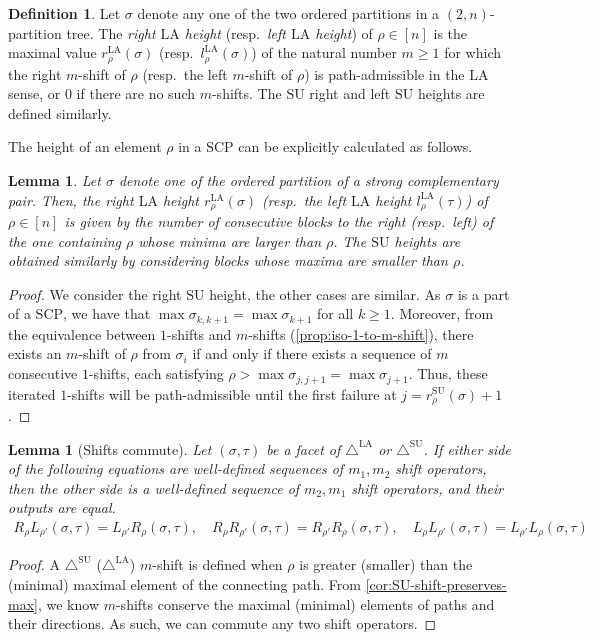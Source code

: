 \documentclass{amsart}
\newcommand{\darkblue}{\color{darkblue}} %
\newcommand{\Guillaume}[1]{\todo[color=magenta!30]{\rm #1 \\ \hfill --- G.}}
\newtheorem{lemma}[theorem]{Lemma}
\theoremstyle{definition}
\newtheorem{definition}[theorem]{Definition}
\newcommand{\resp}{resp.~} %
\newcommand{\defn}[1]{\textsl{\darkblue #1}} %
\newcommand{\SU}{\mathrm{SU}}
\newcommand{\LA}{\mathrm{LA}}
\newcommand{\SUD}{\triangle^{\mathrm{SU}}}
\newcommand{\LAD}{\triangle^{\mathrm{LA}}}
\newcommand{\SCP}{\mathrm{SCP}}
\begin{document}
\begin{definition}
Let $\sigma$ denote any one of the two ordered partitions in a $(2,n)$-partition tree.
The \defn{right $\LA$ height} (\resp \defn{left $\LA$ height}) of $\rho \in [n]$ is the maximal value $r_\rho^\LA(\sigma)$ (\resp $l_\rho^\LA(\sigma)$) of the natural number $m \geq 1$ for which the right $m$-shift of $\rho$ (\resp the left $m$-shift of $\rho$) is path-admissible in the $\LA$ sense, or $0$ if there are no such $m$-shifts.
The $\SU$ right and left $\SU$ heights are defined similarly. 
\end{definition}
\Guillaume{Maybe we can think of a simpler notation?}

The height of an element $\rho$ in a $\SCP$ can be explicitly calculated as follows. 

\begin{lemma}
\label{prop:maximal m-shift formulae}
Let $\sigma$ denote one of the ordered partition of a strong complementary pair. 
Then, the right $\LA$ height $r_\rho^\LA(\sigma)$ (\resp the left $\LA$ height $l_\rho^\LA(\tau)$) of $\rho \in [n]$ is given by the number of consecutive blocks to the right (\resp left) of the one containing $\rho$ whose minima are larger than $\rho$.
The $\SU$ heights are obtained similarly by considering blocks whose maxima are smaller than $\rho$. 
\end{lemma}

\begin{proof}
We consider the right $\SU$ height, the other cases are similar. 
As $\sigma$ is a part of a $\SCP$, we have that $\max \sigma_{k,k+1} = \max \sigma_{k+1}$ for all $k\geq 1$. 
Moreover, from the equivalence between $1$-shifts and $m$-shifts (\cref{prop:iso-1-to-m-shift}), there exists an $m$-shift of $\rho$ from $\sigma_i$ if and only if there exists a sequence of $m$ consecutive $1$-shifts, each satisfying $\rho > \max \sigma_{j,j+1}=\max \sigma_{j+1}$.
Thus, these iterated $1$-shifts will be path-admissible until the first failure at $j=r_\rho^\SU(\sigma)+1$.
\end{proof}

\begin{lemma}[Shifts commute] 
\label{lem:m-shifts commute}
Let $(\sigma,\tau)$ be a facet of $\LAD$ or $\SUD$.
If either side of the following equations are  well-defined sequences of $m_1,m_2$ shift operators, then the other side is a well-defined sequence of $m_2,m_1$ shift operators, and their outputs are equal.
\begin{align*}
	R_{\rho} L_{\rho'}(\sigma,\tau) = L_{\rho'} R_{\rho}(\sigma,\tau), \quad R_{\rho} R_{\rho'}(\sigma,\tau) = R_{\rho'} R_{\rho}(\sigma,\tau), \quad L_{\rho} L_{\rho'}(\sigma,\tau) = L_{\rho'} L_{\rho}(\sigma,\tau)
\end{align*}
\end{lemma}
\begin{proof}
A $\SUD$ ($\LAD$) $m$-shift is defined when $\rho$ is greater (smaller) than the (minimal) maximal element of the connecting path.
From \cref{cor:SU-shift-preserves-max}, we know $m$-shifts conserve the maximal (minimal) elements of paths and their directions.
As such, we can commute any two shift operators.
\end{proof}
\end{document}
